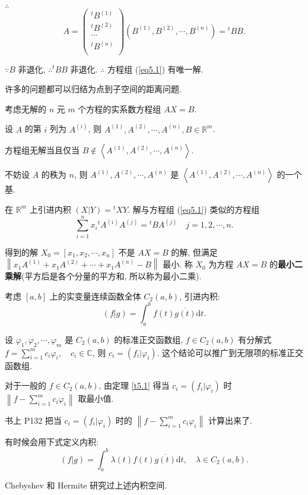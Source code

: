 \documentclass{ctexart}
\begin{document}
$\therefore$
\[A=\begin{pmatrix}
    {}^tB^{(1)} \\
    {}^tB^{(2)} \\
    \cdots \\
    {}^tB^{(n)} \\
\end{pmatrix}(B^{(1)},B^{(2)},\cdots,B^{(n)})={}^tBB.\]

$\because B$ 非退化, $\therefore{}^tBB$ 非退化. $\therefore$ 方程组 (\ref{eq5.1}) 有唯一解.

许多的问题都可以归结为点到子空间的距离问题.
\begin{example}\label{exa5.1}
    考虑无解的 $n$ 元 $m$ 个方程的实系数方程组 $AX=B$.
    
    设 $A$ 的第 $i$ 列为 $A^{(i)}$, 则 $A^{(1)},A^{(2)},\cdots,A^{(n)},B\in\mathbb{R}^m$.
    
    方程组无解当且仅当 $B\notin\left<A^{(1)},A^{(2)},\cdots,A^{(n)}\right>$.
    
    不妨设 $A$ 的秩为 $n$, 则 $A^{(1)},A^{(2)},\cdots,A^{(n)}$ 是 $\left<A^{(1)},A^{(2)},\cdots,A^{(n)}\right>$ 的一个基.

    在 $\mathbb{R}^m$ 上引进内积 $(X|Y)={}^tXY$. 解与方程组 (\ref{eq5.1}) 类似的方程组
    \[\sum\limits_{i=1}^nx_i{}^tA^{(i)}A^{(j)}={}^tBA^{(j)}\quad j=1,2,\cdots,n.\]
    
    得到的解 $X_0=[x_1,x_2,\cdots,x_n]$ 不是 $AX=B$ 的解, 但满足 $\left\|x_1A^{(1)}+x_1A^{(2)}+\cdots+x_1A^{(n)}-B\right\|$ 最小. 称 $X_0$ 为方程 $AX=B$ 的\textbf{最小二乘解}(平方后是各个分量的平方和, 所以称为最小二乘).
\end{example}
\begin{example}
    考虑 $[a,b]$ 上的实变量连续函数全体 $C_2(a,b)$, 引进内积:
    \[(f|g)=\int_a^bf(t)\overline{g(t)}\mathrm{d}t.\]
    
    设 $\varphi_1,\varphi_2,\cdots,\varphi_m$ 是 $C_2(a,b)$ 的标准正交函数组, $f\in C_2(a,b)$ 有分解式 $f=\sum\limits_{i=1}^mc_i\varphi_i,\quad c_i\in\mathbb{C}$, 则 $c_i=(f_i|\varphi_i)$. 这个结论可以推广到无限项的标准正交函数组.

    对于一般的 $f\in C_2(a,b)$, 由定理 \ref{t5.1} 得当 $c_i=(f_i|\varphi_i)$ 时 $\left\|f-\sum\limits_{i=1}^mc_i\varphi_i\right\|$ 取最小值.

    书上 P132 把当 $c_i=(f_i|\varphi_i)$ 时的 $\left\|f-\sum\limits_{i=1}^mc_i\varphi_i\right\|$ 计算出来了.

    有时候会用下式定义内积:
    \[(f|g)=\int_a^b\lambda(t)f(t)\overline{g(t)}\mathrm{d}t,\quad\lambda\in C_2(a,b).\]

    Chebyshev 和 Hermite 研究过上述内积空间.
\end{example}
\end{document}

